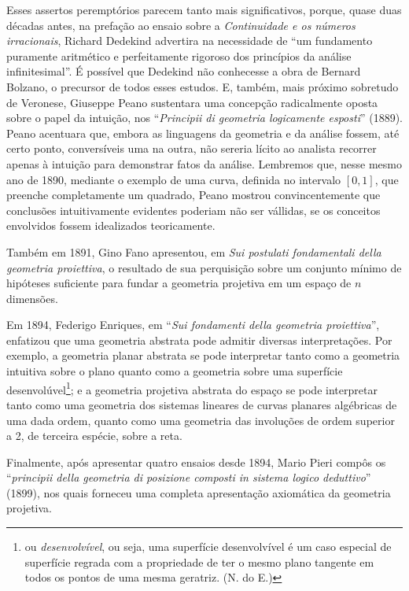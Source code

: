 \documentclass{hipatia}
\begin{document}
Esses assertos peremptórios parecem tanto mais significativos, porque, quase duas décadas antes, na prefação ao ensaio sobre a \emph{Continuidade e os números irracionais},  Richard Dedekind advertira na necessidade de ``um fundamento puramente aritmético e perfeitamente rigoroso dos princípios da análise infinitesimal''. É possível que Dedekind não conhecesse a obra de Bernard Bolzano, o precursor de todos esses estudos.  \cite[ prefação, p. III]{dedekind1872}                                                                                                              
E, também, mais próximo sobretudo de Veronese, Giuseppe Peano sustentara uma concepção radicalmente oposta sobre o papel da intuição, nos  ``\emph{Principii di geometria logicamente esposti}'' (1889). Peano acentuara que, embora as linguagens da geometria e da análise fossem, até certo ponto, conversíveis uma na outra, não sereria lícito ao analista recorrer apenas à intuição para demonstrar fatos da análise. Lembremos que, nesse mesmo ano de 1890, mediante o exemplo de uma curva, definida no intervalo $[0, 1]$, que preenche completamente um quadrado, Peano mostrou convincentemente que conclusões intuitivamente evidentes poderiam não ser vállidas, se os conceitos envolvidos fossem idealizados teoricamente.  \cite[p. 143]{kneebone1963}

Também em 1891, Gino Fano apresentou, em \emph{Sui postulati fondamentali della geometria proiettiva}, o resultado de sua perquisição sobre um conjunto mínimo de hipóteses suficiente para fundar a geometria projetiva em um espaço de $n$ dimensões.  \cite[p. 30]{bottazzini2001} 

Em 1894, Federigo Enriques, em ``\emph{Sui fondamenti della geometria proiettiva}'', enfatizou que uma geometria abstrata pode admitir diversas interpretações. Por exemplo, a geometria planar abstrata se pode interpretar tanto como a geometria intuitiva sobre o plano quanto como a geometria sobre uma superfície desenvolúvel\footnote{ou \emph{desenvolvível}, ou seja, uma superfície desenvolvível é um caso especial de superfície regrada com
a propriedade de ter o mesmo plano tangente em todos os pontos de uma mesma geratriz. (N. do E.)}; e a geometria projetiva abstrata do espaço se pode interpretar tanto como uma geometria dos sistemas lineares de curvas planares algébricas de uma dada ordem, quanto como uma geometria das involuções de ordem superior a 2, de terceira espécie, sobre a reta.   \cite[ p. 312]{bottazzini2001} 

Finalmente, após apresentar quatro ensaios desde 1894, Mario Pieri compôs os ``\emph{principii della geometria di posizione composti in sistema logico deduttivo}'' (1899), nos quais forneceu uma completa apresentação axiomática da geometria projetiva.  \cite[, p. 226--227]{kneebone1963} 
\cite[p. 317]{bottazzini2001}
\end{document}
